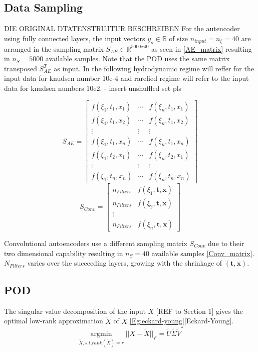 \subsection{Data Sampling}\label{Sec: Data Sampling}
DIE ORIGINAL DTATENSTRUJTUR BESCHREIBEN
For the autencoder using fully connected layers, the input vectors $y_o \in \mathbb{R}$ of size $n_{input} = n_{\xi} = 40$ are arranged in the sampling matrix $S_{AE} \in \mathbb{R}^{5000x40}$ as seen in \cref{AE_matrix} resulting in $n_S = 5000$ available samples. Note that the POD uses the same matrix transposed $S_{AE}^T$ as input. In the following hydrodynamic regime will reffer for the input data for knudsen number 10e-4 and rarefied regime will refer to the input data for knudsen numbers 10e2.
- insert unshuffled set pls
\begin{multicols}{2}
	\begin{equation}
	S_{AE} = \begin{bmatrix}
	f(\xi_1,t_1,x_1)&\cdots &f(\xi_n,t_1,x_1) \\
	f(\xi_1,t_1,x_2)&\cdots &f(\xi_n,t_1,x_2) \\
	\vdots& \vdots & \vdots\\
	f(\xi_1,t_1,x_n)&\cdots &f(\xi_n,t_1,x_n)\\
	f(\xi_1,t_2,x_1)&\cdots &f(\xi_n,t_2,x_1)\\
	\vdots & \vdots & \vdots\\
	f(\xi_1,t_n,x_n)&\cdots &f(\xi_n,t_n,x_n)
	\end{bmatrix}
	\label{AE_matrix}
	\end{equation}\break
	\begin{equation}
	S_{Conv}= \begin{bmatrix}
	n_{Filters}&f(\xi_1,\textbf{t},\textbf{x})\\
	n_{Filters}&f(\xi_2,\textbf{t},\textbf{x})\\
	\vdots\\
	n_{Filters}&f(\xi_n,\textbf{t},\textbf{x})
	\end{bmatrix}
	\label{Conv_matrix}
	\end{equation}
\end{multicols}\noindent
Convolutional autoencoders use a different sampling matrix $S_{Conv}$ due to their two dimensional capability resulting in $n_S = 40$ available samples \cref{Conv_matrix}.$N_{Filters}$ varies over the succeeding layers, growing with the shrinkage of $(\textbf{t},\textbf{x})$.
\subsection{POD}
The singular value decomposition of the input $X$ [REF to Section 1] gives the optimal low-rank approximation $\tilde{X}$ of $X$ \cref{Eg:eckard-young}[Eckard-Young]. 
\begin{equation}
\underset{\tilde{X}, s.t. rank(\tilde{X})=r}{\operatorname{argmin}} || X -\tilde{X} ||_F=\tilde{U}\tilde{\Sigma}\tilde{V}^*
\label{Eg:eckard-young}
\end{equation}
